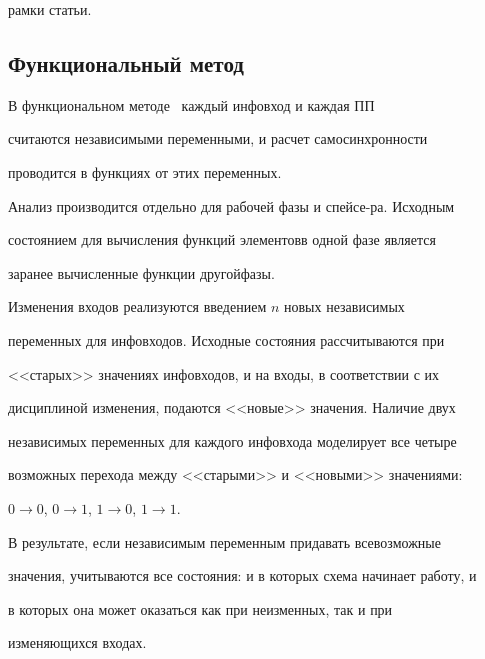 рамки статьи.





\subsection{Функциональный метод} %





В функциональном методе~\cite{5-4} каждый инфовход и каждая ПП 


считаются независимыми переменными, и расчет самосинхронности 


проводится в функциях от этих переменных.





Анализ производится отдельно для рабочей фазы и спейсе-\linebreak ра. Исходным 


состоянием для вычисления функций элементов\linebreak в одной фазе является 


заранее вычисленные функции другой\linebreak фазы.





Изменения входов реализуются введением $n$ новых независимых 


переменных для инфовходов. Исходные состояния рассчитываются при 


<<старых>> значениях инфовходов, и на входы, в соответствии с их 


дисциплиной изменения, подаются <<новые>> значения. Наличие двух 


независимых переменных для каждого инфовхода моделирует все четыре 


возможных перехода между <<старыми>> и <<новыми>> значениями: 


$0\rightarrow 0$, $0\rightarrow 1$, $1\rightarrow 0$, $1\rightarrow 1$.





В результате, если независимым переменным придавать всевозможные 


значения,  учитываются все состояния: и в которых схема начинает работу, и 


в которых она может оказаться как при неизменных, так и при 


изменяющихся входах.





